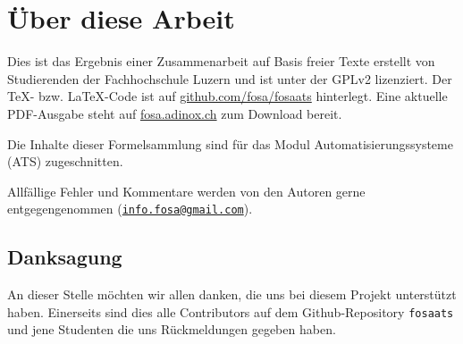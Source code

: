 


\chapter*{Über diese Arbeit}
Dies ist das Ergebnis einer Zusammenarbeit auf Basis freier Texte erstellt von 
Studierenden der Fachhochschule Luzern und ist unter der GPLv2 lizenziert. 
Der \TeX - bzw. \LaTeX -Code ist auf \url{github.com/fosa/fosaats} 
hinterlegt. Eine aktuelle PDF-Ausgabe steht auf \url{fosa.adinox.ch} zum 
Download bereit.

Die Inhalte dieser Formelsammlung sind für das Modul Automatisierungssysteme 
(ATS) zugeschnitten. 
%

Allfällige Fehler und Kommentare werden von den Autoren gerne entgegengenommen
(\href{mailto:info.fosa@gmail.com}{\nolinkurl{info.fosa@gmail.com}}).

\section*{Danksagung}
An dieser Stelle möchten wir allen danken, die uns bei diesem Projekt 
unterstützt haben.
Einerseits sind dies alle Contributors auf dem Github-Repository 
\verb!fosaats! und jene Studenten die uns Rückmeldungen gegeben haben.

